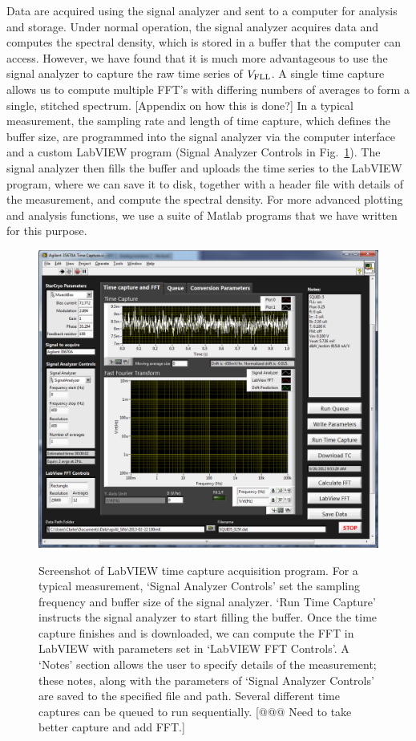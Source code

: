 Data are acquired using the signal analyzer and sent to a computer for analysis and storage. Under normal operation, the signal analyzer acquires data and computes the spectral density, which is stored in a buffer that the computer can access. However, we have found that it is much more advantageous to use the signal analyzer to capture the raw time series of $V_\text{FLL}$. A single time capture allows us to compute multiple FFT's with differing numbers of averages to form a single, stitched spectrum. [Appendix on how this is done?] In a typical measurement, the sampling rate and length of time capture, which defines the buffer size, are programmed into the signal analyzer via the computer interface and a custom LabVIEW program (Signal Analyzer Controls in Fig.~\ref{fig:experimental:LabVIEW_time_capture}). The signal analyzer then fills the buffer and uploads the time series to the LabVIEW program, where we can save it to disk, together with a header file with details of the measurement, and compute the spectral density. For more advanced plotting and analysis functions, we use a suite of Matlab programs that we have written for this purpose.

\begin{figure}
\centering\includegraphics[width=6.5in]{experimental/LabVIEW_time_capture.png}\\
\caption[Screenshot of LabVIEW time capture acquisition program]{Screenshot of LabVIEW time capture acquisition program. For a typical measurement, `Signal Analyzer Controls' set the sampling frequency and buffer size of the signal analyzer. `Run Time Capture' instructs the signal analyzer to start filling the buffer. Once the time capture finishes and is downloaded, we can compute the FFT in LabVIEW with parameters set in `LabVIEW FFT Controls'. A `Notes' section allows the user to specify details of the measurement; these notes, along with the parameters of `Signal Analyzer Controls' are saved to the specified file and path. Several different time captures can be queued to run sequentially. [@@@ Need to take better capture and add FFT.]}
\label{fig:experimental:LabVIEW_time_capture}
\end{figure}

